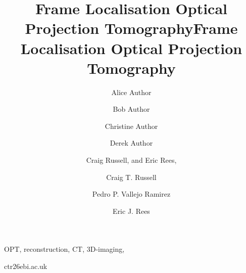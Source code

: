 \documentclass{osa-article}
\begin{document}
\title{Frame Localisation Optical Projection Tomography}

\ifdefined\nature

  \author[1,*]{Alice Author}
  \author[2]{Bob Author}
  \author[1,2,+]{Christine Author}
  \author[2,+]{Derek Author}


  \flushbottom
\fi
\ifdefined\osa
  \author{Craig Russell, and Eric Rees,}

  \address{Dept. of Chemical Engineering and Biotechnology, Cambridge University, Cambridge, U.K. \\
     European Bioinformatics Institute, Wellcome Genome Campus, Cambridge CB10 1SD}
\fi
\ifdefined\bioarxiv
  \title{Frame Localisation Optical Projection Tomography}
  \author[1,2 \Letter]{Craig T. Russell}
  \author[1,3]{Pedro P. Vallejo Ramirez}
  \author[1]{Eric J. Rees}




  \maketitle

  \linenumbers{}


  \begin{keywords}
    OPT, reconstruction, CT, 3D-imaging,
  \end{keywords}

  \begin{corrauthor}
    ctr26\at ebi.ac.uk
  \end{corrauthor}
\end{document}
